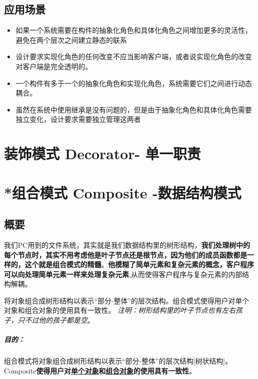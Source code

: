 \documentclass[UTF8,a4paper,12pt]{ctexbook}
\begin{document}
	\subsection{应用场景}
		\begin{itemize}
			\item 如果一个系统需要在构件的抽象化角色和具体化角色之间增加更多的灵活性，避免在两个层次之间建立静态的联系
			\item 设计要求实现化角色的任何改变不应当影响客户端，或者说实现化角色的改变对客户端是完全透明的。
			\item 一个构件有多于一个的抽象化角色和实现化角色，系统需要它们之间进行动态耦合。
			\item 虽然在系统中使用继承是没有问题的，但是由于抽象化角色和具体化角色需要独立变化，设计要求需要独立管理这两者
		\end{itemize}

	
\newpage
\section{装饰模式 Decorator- 单一职责}	


\newpage
\section{*组合模式 Composite -数据结构模式}	
	\subsection{概要}
		我们PC用到的文件系统，其实就是我们数据结构里的树形结构，\textbf{我们处理树中的每个节点时，其实不用考虑他是叶子节点还是根节点，因为他们的成员函数都是一样的，这个就是组合模式的精髓}。\textbf{他模糊了简单元素和复杂元素的概念，客户程序可以向处理简单元素一样来处理复杂元素},从而使得客户程序与复杂元素的内部结构解耦。
		
		将对象组合成树形结构以表示“部分-整体”的层次结构。组合模式使得用户对单个对象和组合对象的使用具有一致性。
		\textit{注明：树形结构里的叶子节点也有左右孩子，只不过他的孩子都是空}。
		
		\subparagraph{目的：}组合模式将对象组合成树形结构以表示“部分-整体”的层次结构[树状结构]。Composite\textbf{使得用户对\underline{单个对象}和\underline{组合对象}的使用具有一致性}。
		
\end{document}
